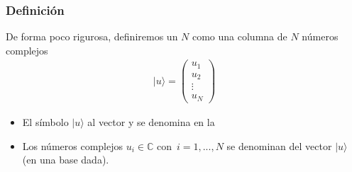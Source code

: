 \documentclass[letterpaper,10pt,english]{jupyterBook}
\newcommand{\ket}[1]{|#1\rangle}
\begin{document}
\subsubsection{Definición}
\label{\detokenize{docs/Part_01_Formalismo/Chapter_01_02_Formalismo_matem_xe1tico/01_02_Vectores_myst:definicion}}
\sphinxAtStartPar
De forma poco rigurosa, definiremos un  \(N\) como una columna de \(N\) números complejos
\begin{equation*}
\begin{split}
|u\rangle = \begin{pmatrix} {u_1}\\ {u_2}\\ \vdots \\ {u_N} 
\end{pmatrix}
\end{split}
\end{equation*}\begin{itemize}
\item {} 
\sphinxAtStartPar
El símbolo \(\ket{u}\)   al vector y se denomina  en la 

\item {} 
\sphinxAtStartPar
Los números complejos \(u_i \in {\mathbb C}\) con \(\, i=1,...,N\) se denominan  del vector \(\ket{u}\) (en una base dada).

\end{itemize}
\end{document}
